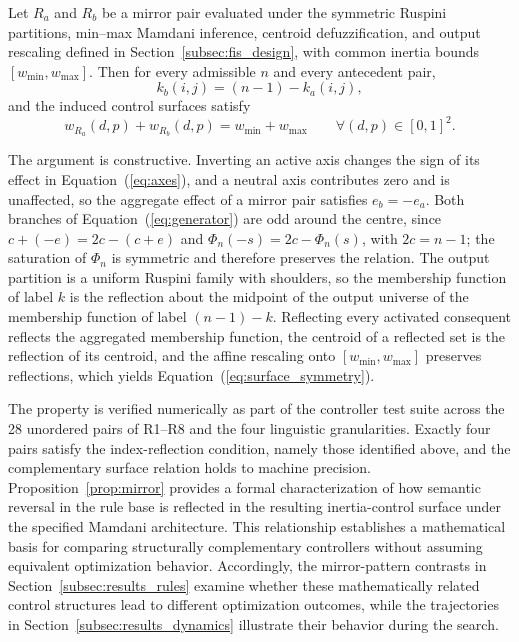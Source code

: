 \begin{Proposition}
\label{prop:mirror}
Let $R_a$ and $R_b$ be a mirror pair evaluated under the symmetric Ruspini partitions, min--max Mamdani inference, centroid defuzzification, and output rescaling defined in Section~\ref{subsec:fis_design}, with common inertia bounds $[w_{\min},w_{\max}]$. Then for every admissible $n$ and every antecedent pair,
\begin{equation}
k_b(i,j) = (n-1) - k_a(i,j),
\end{equation}
and the induced control surfaces satisfy
\begin{equation}
\label{eq:surface_symmetry}
w_{R_a}(d,p) + w_{R_b}(d,p) = w_{\min} + w_{\max}
\qquad \forall (d,p) \in [0,1]^2 .
\end{equation}
\end{Proposition}


The argument is constructive. Inverting an active axis changes the sign of its effect in Equation~(\ref{eq:axes}), and a neutral axis contributes zero and is unaffected, so the aggregate effect of a mirror pair satisfies $e_b = -e_a$. Both branches of Equation~(\ref{eq:generator}) are odd around the centre, since $c + (-e) = 2c - (c+e)$ and $\Phi_n(-s) = 2c - \Phi_n(s)$, with $2c = n-1$; the saturation of $\Phi_n$ is symmetric and therefore preserves the relation. The output partition is a uniform Ruspini family with shoulders, so the membership function of label $k$ is the reflection about the midpoint of the output universe of the membership function of label $(n-1)-k$. Reflecting every activated consequent reflects the aggregated membership function, the centroid of a reflected set is the reflection of its centroid, and the affine rescaling onto $[w_{\min},w_{\max}]$ preserves reflections, which yields Equation~(\ref{eq:surface_symmetry}).

The property is verified numerically as part of the controller test suite across the 28 unordered pairs of R1--R8 and the four linguistic granularities. Exactly four pairs satisfy the index-reflection condition, namely those identified above, and the complementary surface relation holds to machine precision. Proposition~\ref{prop:mirror} provides a formal characterization of how semantic reversal in the rule base is reflected in the resulting inertia-control surface under the specified Mamdani architecture. This relationship establishes a mathematical basis for comparing structurally complementary controllers without assuming equivalent optimization behavior. Accordingly, the mirror-pattern contrasts in Section~\ref{subsec:results_rules} examine whether these mathematically related control structures lead to different optimization outcomes, while the trajectories in Section~\ref{subsec:results_dynamics} illustrate their behavior during the search.


